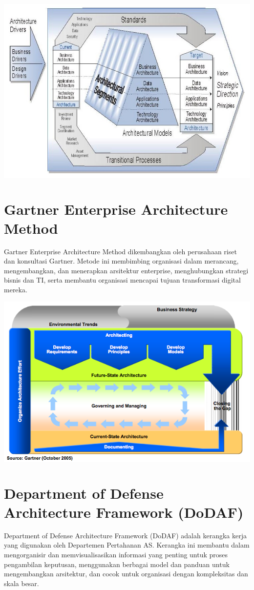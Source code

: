 \begin{center}
	\includegraphics[width=.75\textwidth]{../figures/feaf}
\end{center}

\section{Gartner Enterprise Architecture Method}
Gartner Enterprise Architecture Method dikembangkan oleh perusahaan riset dan konsultasi Gartner. Metode ini membimbing organisasi dalam merancang, mengembangkan, dan menerapkan arsitektur enterprise, menghubungkan strategi bisnis dan TI, serta membantu organisasi mencapai tujuan transformasi digital mereka.

\begin{center}
	\includegraphics[width=.70\textwidth]{../figures/gartner}
\end{center}

\section{Department of Defense Architecture Framework (DoDAF)}
Department of Defense Architecture Framework (DoDAF) adalah kerangka kerja yang digunakan oleh Departemen Pertahanan AS. Kerangka ini membantu dalam mengorganisir dan memvisualisasikan informasi yang penting untuk proses pengambilan keputusan, menggunakan berbagai model dan panduan untuk mengembangkan arsitektur, dan cocok untuk organisasi dengan kompleksitas dan skala besar.

